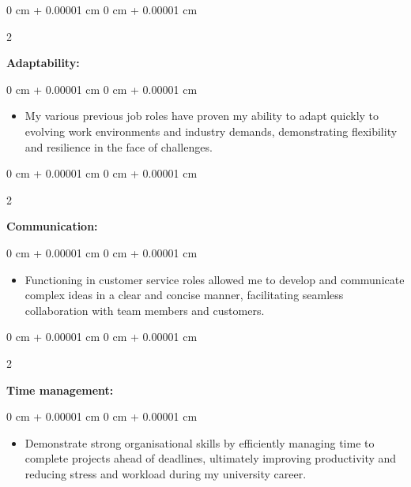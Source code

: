 \documentclass[10pt, letterpaper]{article}
\newenvironment{highlights}{
    \begin{itemize}[
        topsep=0.10 cm,
        parsep=0.10 cm,
        partopsep=0pt,
        itemsep=0pt,
        leftmargin=0 cm + 10pt
    ]
}{
    \end{itemize}
} %
\newenvironment{onecolentry}{
    \begin{adjustwidth}{
        0 cm + 0.00001 cm
    }{
        0 cm + 0.00001 cm
    }
}{
    \end{adjustwidth}
} %
\newenvironment{twocolentry}[2][]{
    \onecolentry
    \def\secondColumn{#2}
    \setcolumnwidth{\fill, 4.5 cm}
    \begin{paracol}{2}
}{
    \switchcolumn \raggedleft \secondColumn
    \end{paracol}
    \endonecolentry
} %
\begin{document}
        \begin{twocolentry}{
            
        }
            \textbf{Adaptability:}\end{twocolentry}

        \vspace{-0.05 cm}
        \begin{onecolentry}
            \begin{highlights}
                \item My various previous job roles have proven my ability to adapt quickly to evolving work environments and industry demands, demonstrating flexibility and resilience in the face of challenges. 
                
            \end{highlights}
        \end{onecolentry}
        \vspace{0.2 cm}

        \begin{twocolentry}{
            
        }
            \textbf{Communication:}\end{twocolentry}

        \vspace{-0.05 cm}
        \begin{onecolentry}
            \begin{highlights}
                \item Functioning in customer service roles allowed me to develop and communicate complex ideas in a clear and concise manner, facilitating seamless collaboration with team members and customers. 
                
            \end{highlights}
        \end{onecolentry}
              \vspace{0.2 cm}

        \begin{twocolentry}{
            
        }
            \textbf{Time management:}\end{twocolentry}

        \vspace{-0.05 cm}
        \begin{onecolentry}
            \begin{highlights}
                \item Demonstrate strong organisational skills by efficiently managing time to complete projects ahead of deadlines, ultimately improving productivity and reducing stress and workload during my university career. 
                
            \end{highlights}
        \end{onecolentry}
        

       


        
\end{document}
